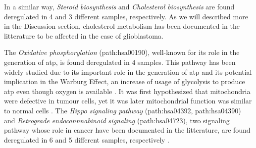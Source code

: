 In a similar way, \textit{Steroid biosynthesis} and \textit{Cholesterol biosynthesis} are found deregulated in 4 and 3 different samples, respectively.
As we will described more in the Discussion section, cholesterol metabolism has been documented in the litterature to be affected in the case of glioblastoma.

The \textit{Oxidative phosphorylation} (path:hsa00190), well-known for its role in the generation of \acrshort{atp}, is found deregulated in 4 samples.
This pathway has been widely studied due to its important role in the generation of \acrshort{atp} and its potential implication in the Warburg Effect, an increase of usage of glycolysis to produce \acrshort{atp} even though oxygen is available \cite*{Spinicci2022}.
It was first hypothesized that mitochondria were defective in tumour cells, yet it was later mitochondrial function was similar to normal cells \cite*{Cairns2011}.
The \textit{Hippo signaling pathway} (path:hsa04392, path:hsa04390) and \textit{Retrograde endocannnabinoid signaling} (path:hsa04723), two signaling pathway whose role in cancer have been documented in the litterature, are found deregulated in 6 and 5 different samples, respectively \cite*{Wei2014,Liu2018,BasuRoy2015}.

